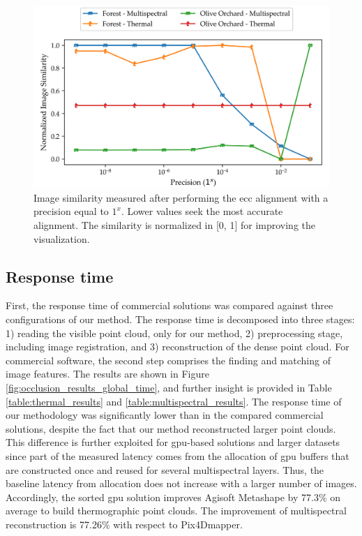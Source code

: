 \begin{figure}[ht]
    \centering
    \includegraphics[width=\linewidth]{figs/multi_thermal_projection/results/ecc_precision.png}
    \caption{Image similarity measured after performing the \acrshort{ecc} alignment with a precision equal to $1^x$. Lower values seek the most accurate alignment. The similarity is normalized in [0, 1] for improving the visualization. }
    \label{fig:ecc_precision}
\end{figure}

\subsection{Response time}

First, the response time of commercial solutions was compared against three configurations of our method. The response time is decomposed into three stages: 1) reading the visible point cloud, only for our method, 2) preprocessing stage, including image registration, and 3) reconstruction of the dense point cloud. For commercial software, the second step comprises the finding and matching of image features. The results are shown in Figure \ref{fig:occlusion_results_global_time}, and further insight is provided in Table \ref{table:thermal_results} and \ref{table:multispectral_results}. The response time of our methodology was significantly lower than in the compared commercial solutions, despite the fact that our method reconstructed larger point clouds. This difference is further exploited for \acrshort{gpu}-based solutions and larger datasets since part of the measured latency comes from the allocation of \acrshort{gpu} buffers that are constructed once and reused for several multispectral layers. Thus, the baseline latency from allocation does not increase with a larger number of images. Accordingly, the sorted \acrshort{gpu} solution improves Agisoft Metashape by 77.3\% on average to build thermographic point clouds. The improvement of multispectral reconstruction is 77.26\% with respect to Pix4Dmapper. 


